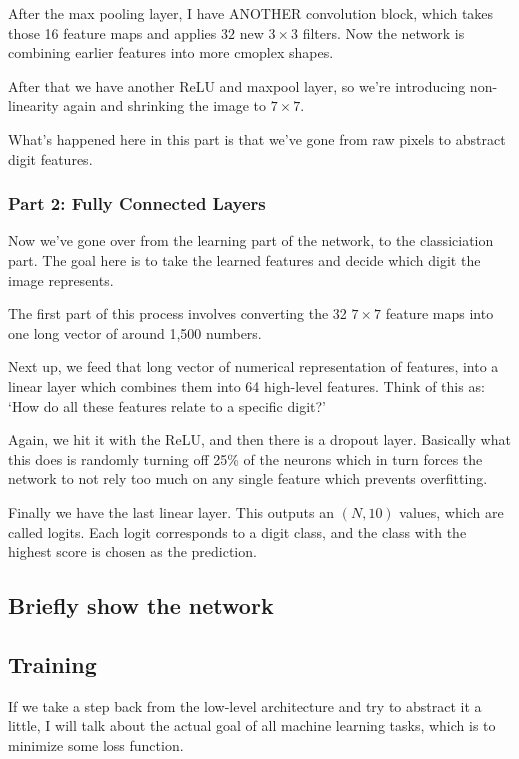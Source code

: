 \documentclass{article}
\begin{document}
After the max pooling layer, I have ANOTHER convolution block, which takes those 16 feature maps and applies $32$ new $3 \times 3$ filters. Now the network is combining earlier features into more cmoplex shapes. 

After that we have another ReLU and maxpool layer, so we're introducing non-linearity again and shrinking the image to $7\times 7$. 

What's happened here in this part is that we've gone from raw pixels to abstract digit features. 

\newpage

\subsubsection{Part 2: Fully Connected Layers}

Now we've gone over from the learning part of the network, to the classiciation part. The goal here is to take the learned features and decide which digit the image represents. 

The first part of this process involves converting the 32 $7\times 7$ feature maps into one long vector of around 1,500 numbers. 

Next up, we feed that long vector of numerical representation of features, into a linear layer which combines them into 64 high-level features. Think of this as: `How do all these features relate to a specific digit?'

Again, we hit it with the ReLU, and then there is a dropout layer. Basically what this does is randomly turning off 25\% of the neurons which in turn forces the network to not rely too much on any single feature which prevents overfitting. 

Finally we have the last linear layer. This outputs an $(N, 10)$ values, which are called logits. Each logit corresponds to a digit class, and the class with the highest score is chosen as the prediction. 

\subsection{Briefly show the network}

\subsection{Training}

If we take a step back from the low-level architecture and try to abstract it a little, I will talk about the actual goal of all machine learning tasks, which is to minimize some loss function. 
\end{document}
